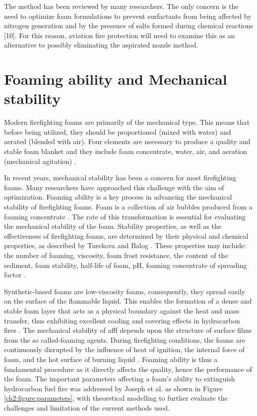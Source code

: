 The method has been reviewed by many researchers.  The only concern is the need to optimize foam formulations to prevent surfactants from being affected by nitrogen generation and by the presence of salts formed during chemical reactions [10].  For this reason, aviation fire protection will need to examine this as an alternative to possibly eliminating the aspirated nozzle method.

\section{Foaming ability and Mechanical stability}
Modern firefighting foams are primarily of the mechanical type. This means that before being utilized, they should be proportioned (mixed with water) and aerated (blended with air). Four elements are necessary to produce a quality and stable foam blanket and they include foam concentrate, water, air, and aeration (mechanical agitation) \cite{oguike2013study}. 

In recent years, mechanical stability has been a concern for most firefighting foams. Many researchers have approached this challenge with the aim of optimization. Foaming ability is a key process in advancing the mechanical stability of firefighting foams. Foam is a collection of air bubbles produced from a foaming concentrate  \cite{oguike2013study}. The rate of this transformation is essential for evaluating the mechanical stability of the foam. Stability properties, as well as the effectiveness of firefighting foams, are determined by their physical and chemical properties, as described by Turekova and Balog \cite{turekova2011environmental}. These properties may include: the number of foaming, viscosity, foam frost resistance, the content of the sediment, foam stability, half-life of foam, pH, foaming concentrate of spreading factor \cite{turekova2011environmental}. 

Synthetic-based foams are low-viscosity foams, consequently, they spread easily on the surface of the flammable liquid. This enables the formation of a dense and stable foam layer that acts as a physical boundary against the heat and mass transfer, thus exhibiting excellent cooling and covering effects in hydrocarbon fires \cite{xu2020fire}. The mechanical stability of \acrshort{afff} depends upon the structure of surface films from the so called-foaming agents. During firefighting conditions, the foams are continuously disrupted by the influence of heat of ignition, the internal force of foam, and the hot surface of burning liquid \cite{turekova2011environmental}. Foaming ability is thus a fundamental procedure as it directly affects the quality, hence the performance of the foam. The important parameters affecting a foam's ability to extinguish hydrocarbon fuel fire was addressed by Joseph et al. \cite{scheffey1995evaluating} as shown in Figure \ref{ch2:figure:parameters}, with theoretical modelling to further evaluate the challenges and limitation of the current methods used. 

